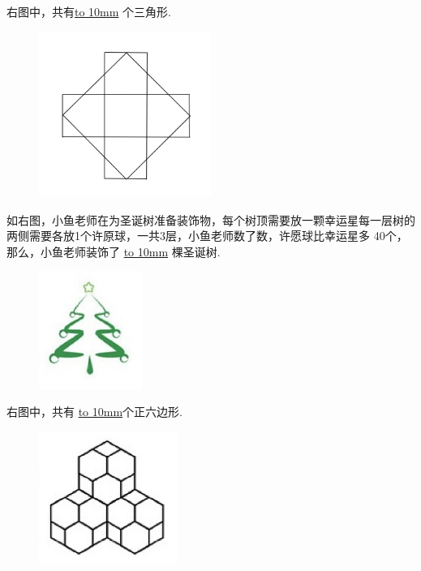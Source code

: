 \item {右图中，共有\underline{\hbox to 10mm{}} 个三角形.
    \begin{figure}[H] 
        \centering
        \includegraphics[width=0.5\textwidth]{./pics/Chapter_6/12.png}
    \end{figure}
}

\item {如右图，小鱼老师在为圣诞树准备装饰物，每个树顶需要放一颗幸运星每一层树的两侧需要各放1个许原球，一共3层，小鱼老师数了数，许愿球比幸运星多 40个，那么，小鱼老师装饰了 \underline{\hbox to 10mm{}} 棵圣诞树.
    \begin{figure}[H] 
        \centering
        \includegraphics[width=0.3\textwidth]{./pics/Chapter_6/13.png}
    \end{figure}
}

\item {
    右图中，共有 \underline{\hbox to 10mm{}}个正六边形.
    \begin{figure}[H] 
        \centering
        \includegraphics[width=0.4\textwidth]{./pics/Chapter_6/14.png}
    \end{figure}
}

